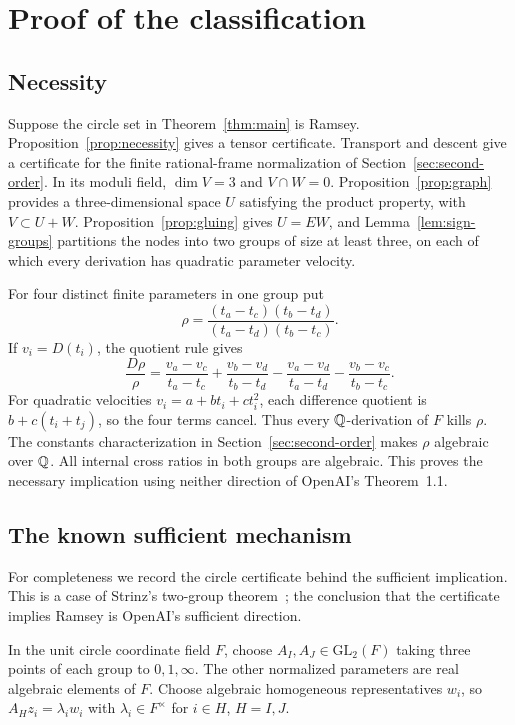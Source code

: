 \section{Proof of the classification}\label{sec:classification}

\subsection{Necessity}
Suppose the circle set in Theorem~\ref{thm:main} is Ramsey.
Proposition~\ref{prop:necessity} gives a tensor certificate.
Transport and descent give a certificate for the finite rational-frame
normalization of Section~\ref{sec:second-order}. In its moduli field,
$\dim V=3$ and $V\cap W=0$. Proposition~\ref{prop:graph} provides
a three-dimensional space $U$ satisfying the product property,
with $V\subset U+W$. Proposition~\ref{prop:gluing} gives $U=EW$,
and Lemma~\ref{lem:sign-groups} partitions the nodes into two
groups of size at least three, on each of which every derivation
has quadratic parameter velocity.

For four distinct finite parameters in one group put
\[
 \rho=\frac{(t_a-t_c)(t_b-t_d)}{(t_a-t_d)(t_b-t_c)}.
\]
If $v_i=D(t_i)$, the quotient rule gives
\begin{equation}\label{eq:cross-derivative}
 \frac{D\rho}{\rho}=
 \frac{v_a-v_c}{t_a-t_c}+\frac{v_b-v_d}{t_b-t_d}
 -\frac{v_a-v_d}{t_a-t_d}-\frac{v_b-v_c}{t_b-t_c}.
\end{equation}
For quadratic velocities $v_i=a+bt_i+ct_i^2$, each difference
quotient is $b+c(t_i+t_j)$, so the four terms cancel. Thus every
$\mathbb Q$-derivation of $F$ kills $\rho$. The constants characterization
in Section~\ref{sec:second-order} makes $\rho$ algebraic over
$\mathbb Q$. All internal cross ratios in both groups are algebraic.
This proves the necessary implication using neither direction of
OpenAI's Theorem~1.1.

\subsection{The known sufficient mechanism}\label{sec:positive}
For completeness we record the circle certificate behind the
sufficient implication. This is a case of Strinz's two-group
theorem~\cite[Theorem C2]{strinz2026spherical}; the conclusion
that the certificate implies Ramsey is OpenAI's sufficient direction.

In the unit circle coordinate field $F$, choose
$A_I,A_J\in\mathrm{GL}_2(F)$ taking three points of each group to
$0,1,\infty$. The other normalized parameters are real algebraic
elements of $F$. Choose algebraic homogeneous representatives
$w_i$, so $A_Hz_i=\lambda_iw_i$ with $\lambda_i\in F^\times$
for $i\in H$, $H=I,J$.

